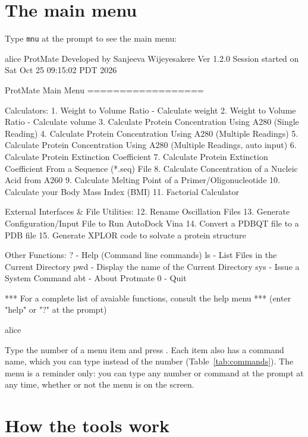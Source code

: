 \documentclass[11pt,a4paper,oneside]{report}
\newcommand{\cmd}[1]{\texttt{#1}}            %
\newcommand{\key}[1]{\fbox{\footnotesize\textsf{#1}}}
\newcommand{\inp}[1]{\textbf{\textcolor{pmblue}{#1}}}
\begin{document}
\section{The main menu}\label{sec:mnu}

Type \cmd{mnu} at the prompt to see the main menu:

\begin{session}
alice%
ProtMate
Developed by Sanjeeva Wijeyesakere
Ver 1.2.0       Session started on Sat Oct 25 09:15:02 PDT 2026

ProtMate Main Menu
==================

Calculators:
 1.  Weight to Volume Ratio - Calculate weight
 2.  Weight to Volume Ratio - Calculate volume
 3.  Calculate Protein Concentration Using A280 (Single Reading)
 4.  Calculate Protein Concentration Using A280 (Multiple Readings)
 5.  Calculate Protein Concentration Using A280 (Multiple Readings, auto input)
 6.  Calculate Protein Extinction Coefficient
 7.  Calculate Protein Extinction Coefficient From a Sequence (*.seq) File
 8.  Calculate Concentration of a Nucleic Acid from A260
 9.  Calculate Melting Point of a Primer/Oligonucleotide
 10. Calculate your Body Mass Index (BMI)
 11. Factorial Calculator

External Interfaces & File Utilities:
 12. Rename Oscillation Files
 13. Generate Configuration/Input File to Run AutoDock Vina
 14. Convert a PDBQT file to a PDB file
 15. Generate XPLOR code to solvate a protein structure

Other Functions:
 ?   - Help (Command line commands)
 ls  - List Files in the Current Directory
 pwd - Display the name of the Current Directory
 sys - Issue a System Command
 abt - About Protmate
 0   - Quit

*** For a complete list of avaiable functions, consult the help menu
*** (enter "help" or "?" at the prompt)

alice%
\end{session}

Type the number of a menu item and press \key{Return}. Each item also has a command name, which you
can type instead of the number (Table~\ref{tab:commands}). The menu is a reminder only: you can
type any number or command at the prompt at any time, whether or not the menu is on the screen.

\section{How the tools work}
\end{document}
